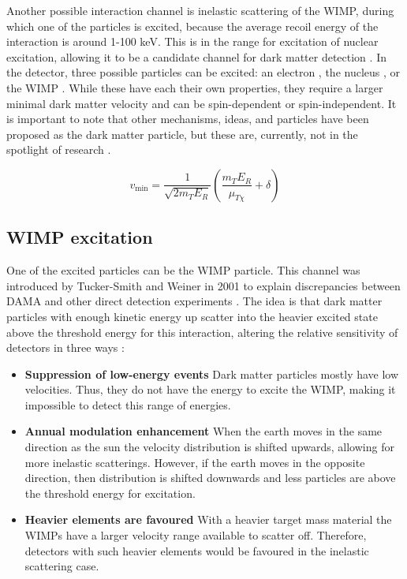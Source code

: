 \documentclass{article}
\begin{document}
Another possible interaction channel is inelastic scattering of the WIMP, during which one of the particles is excited, because the average recoil energy of the interaction is around 1-100 keV. This is in the range for excitation of nuclear excitation, allowing it to be a candidate channel for dark matter detection \cite{Goodman:1984dc, Ellis:1988nb}. In the detector, three possible particles can be excited: an electron \cite{Starkman:1994gf}, the nucleus \cite{Ellis:1988nb}, or the WIMP \cite{TuckerSmith:2001hy, TuckerSmith:2004jv, Miao:2013sqa}. While these have each their own properties, they require a larger minimal dark matter velocity \cite{TuckerSmith:2001hy} and can be spin-dependent \cite{McCabe:2015eia} or spin-independent. It is important to note that other mechanisms, ideas, and particles have been proposed \cite{TuckerSmith:2004jv,Foot:2013uxa, Undagoitia:2015gya, Bramante:2016rdh} as the dark matter particle, but these are, currently, not in the spotlight of research \cite{Agnese:2018col}. 

\begin{equation} \label{vmin_inel}
    v_\text{min} = \frac{1}{\sqrt{2m_TE_R}} \left(\frac{m_TE_R}{\mu_{T \chi}} + \delta \right)
\end{equation}


\subsection{WIMP excitation}

One of the excited particles can be the WIMP particle. This channel was introduced by Tucker-Smith and Weiner in 2001 \cite{TuckerSmith:2001hy} to explain discrepancies between DAMA \cite{Finkbeiner:2009ug} and other direct detection experiments \cite{Chang:2008gd, Ahmed:2008eu}. The idea is that dark matter particles with enough kinetic energy up scatter into the heavier excited state above the threshold energy for this interaction, altering the relative sensitivity of detectors in three ways \cite{TuckerSmith:2001hy, TuckerSmith:2004jv, Chang:2008gd}:
\begin{itemize}
    \item \textbf{Suppression of low-energy events} Dark matter particles mostly have low velocities. Thus, they do not have the energy to excite the WIMP, making it impossible to detect this range of energies. 

    \item \textbf{Annual modulation enhancement} When the earth moves in the same direction as the sun the velocity distribution is shifted upwards, allowing for more inelastic scatterings. However, if the earth moves in the opposite direction, then distribution is shifted downwards and less particles are above the threshold energy for excitation. 

    \item \textbf{Heavier elements are favoured} With a heavier target mass material the WIMPs have a larger velocity range available to scatter off. Therefore, detectors with such heavier elements would be favoured in the inelastic scattering case. 
\end{itemize}
\end{document}

